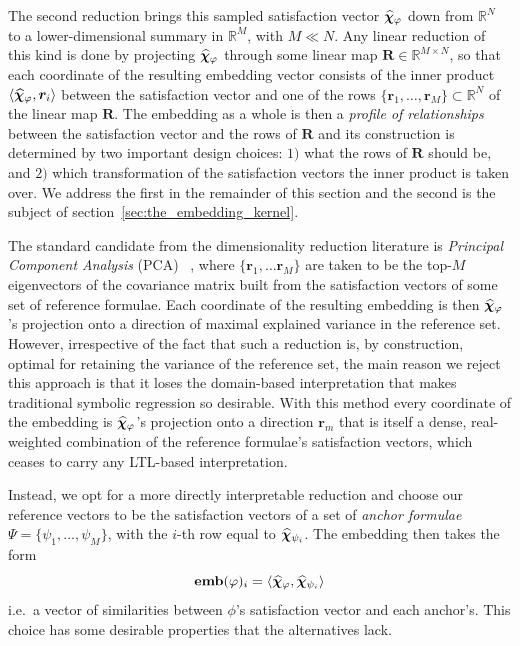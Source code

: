 \documentclass[titlepage,a4paper,11pt]{report}
\begin{document}
    The second reduction brings this sampled satisfaction vector $\bm{\widehat\chi}_\varphi$ down from $\mathbb{R}^N$ to a lower-dimensional summary in $\mathbb{R}^M$, with $M \ll N$. Any linear reduction of this kind is done by projecting $\bm{\widehat\chi}_\varphi$ through some linear map $\bm R \in \mathbb{R}^{M\times N}$, so that each coordinate of the resulting embedding vector consists of the inner product $\langle \bm{\widehat\chi}_\varphi , \bm r_i\rangle$ between the satisfaction vector and one of the rows $\{\bm r_1, \dots, \bm r_M\} \subset \mathbb{R}^N$ of the linear map $\bm R$. The embedding as a whole is then a \emph{profile of relationships} between the satisfaction vector and the rows of $\bm R$ and its construction is determined by two important design choices: $1)$ what the rows of $\bm R$ should be, and $2)$ which transformation of the satisfaction vectors the inner product is taken over. We address the first in the remainder of this section and the second is the subject of section~\ref{sec:the_embedding_kernel}.

    The standard candidate from the dimensionality reduction literature is \textit{Principal Component Analysis} (PCA) ~\citep{van_der_maaten_dimensionality_2007, hasan_review_2021}, where $\{\bm r_1, \dots \bm r_M \}$ are taken to be the top-$M$ eigenvectors of the covariance matrix built from the satisfaction vectors of some set of reference formulae. Each coordinate of the resulting embedding is then $\bm{\widehat\chi}_\varphi$'s projection onto a direction of maximal explained variance in the reference set. However, irrespective of the fact that such a reduction is, by construction, optimal for retaining the variance of the reference set, the main reason we reject this approach is that it loses the domain-based interpretation that makes traditional symbolic regression so desirable. With this method every coordinate of the embedding is $\bm{\widehat\chi}_\varphi$'s projection onto a direction $\bm r_m$ that is itself a dense, real-weighted combination of the reference formulae's satisfaction vectors, which ceases to carry any LTL-based interpretation.

    Instead, we opt for a more directly interpretable reduction and choose our reference vectors to be the satisfaction vectors of a set of \emph{anchor formulae} $\Psi = \{\psi_1, \dots, \psi_M\}$, with the $i$-th row equal to $\bm{\widehat\chi}_{\psi_i}$. The embedding then takes the form 
    \begin{equation}
        \textbf{emb}(\varphi)_i = \langle\bm{\widehat\chi}_\varphi, \bm{\widehat\chi}_{\psi_i}\rangle
    \end{equation}
    i.e.\ a vector of similarities between $\phi$'s satisfaction vector and each anchor's. This choice has some desirable properties that the alternatives lack. 
    
\end{document}
